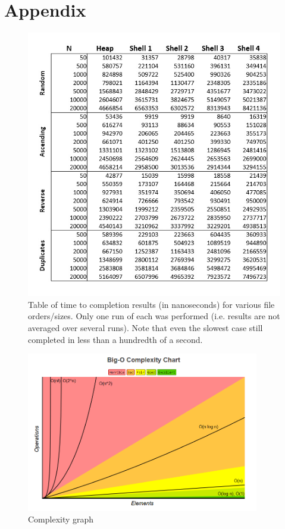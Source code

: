 \documentclass[12pt, titlepage]{article}
\begin{document}
\newpage

\section{Appendix}

\begin{figure} [!htbp]
	\centering
	\includegraphics[width=5in]{Performance}
	\caption{Table of time to completion results (in nanoseconds) for various file orders/sizes. Only one run of each was performed (i.e. results are not averaged over several runs). Note that even the slowest case still completed in less than a hundredth of a second.}
\end{figure}

\begin{figure} [!htbp]
	\centering
	\includegraphics[width=4in]{complexity}
	\caption{Complexity graph}
\end{figure}
\end{document}
